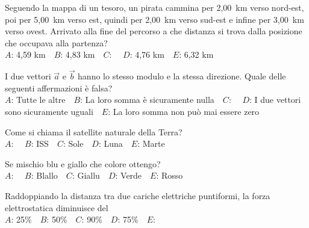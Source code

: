 \mcquestionfooter



\def\mcquestionnumber{6}


\mcquestionheader Seguendo la mappa di un tesoro, un pirata cammina per 2,00~km verso nord-est, poi per 5,00~km verso est, quindi per 2,00~km verso sud-est e infine per 3,00~km verso ovest. Arrivato alla fine del percorso a che distanza si trova dalla posizione che occupava alla partenza?\\
{$A$}: 4,59 km\ \ {$B$}: 4,83 km\ \ {$C$}: \ \ {$D$}: 4,76 km\ \ {$E$}: 6,32 km\ \ 

\mcquestionfooter



\def\mcquestionnumber{7}


\mcquestionheader I due vettori $\vec{a}$ e $\vec{b}$ hanno lo stesso modulo e la stessa direzione. Quale delle seguenti affermazioni è falsa?\\
{$A$}: Tutte le altre\ \ {$B$}: La loro somma è sicuramente nulla\ \ {$C$}: \ \ {$D$}: I due vettori sono sicuramente uguali\ \ {$E$}: La loro somma non può mai essere zero\ \ 

\mcquestionfooter



\def\mcquestionnumber{8}


\mcquestionheader Come si chiama il satellite naturale della Terra?\\
{$A$}: \ \ {$B$}: ISS\ \ {$C$}: Sole\ \ {$D$}: Luna\ \ {$E$}: Marte\ \ 

\mcquestionfooter



\def\mcquestionnumber{9}


\mcquestionheader Se mischio blu e giallo che colore ottengo?\\
{$A$}: \ \ {$B$}: Blallo\ \ {$C$}: Giallu\ \ {$D$}: Verde\ \ {$E$}: Rosso\ \ 

\mcquestionfooter



\def\mcquestionnumber{10}


\mcquestionheader Raddoppiando la distanza tra due cariche elettriche puntiformi, la forza elettrostatica diminuisce del\\
{$A$}: 25\%\ \ {$B$}: 50\%\ \ {$C$}: 90\%\ \ {$D$}: 75\%\ \ {$E$}: \ \ 

\mcquestionfooter



\def\mcquestionnumber{11}


